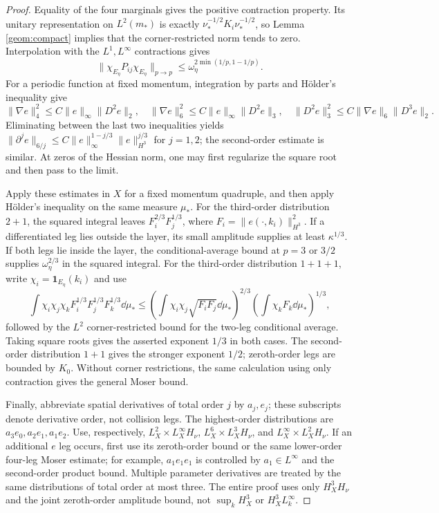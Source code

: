 \begin{proof}
Equality of the four marginals gives the positive contraction property.
Its unitary representation on $L^2(m_*)$ is exactly
$\nu_*^{-1/2}K_i\nu_*^{-1/2}$, so Lemma \ref{geom:compact}
implies that the corner-restricted norm tends to zero.
Interpolation with the $L^1,L^\infty$ contractions gives
\[
 \|\chi_{E_\eta} P_{ij}\chi_{E_\eta}\|_{p\to p}
       \le\omega_\eta^{2\min(1/p,1-1/p)}.
\]
For a periodic function at fixed momentum, integration by parts and
Hölder's inequality give
\[
 \|\nabla e\|_4^2\le C\|e\|_\infty\|D^2e\|_2,
 \quad \|\nabla e\|_6^2\le C\|e\|_\infty\|D^2e\|_3,
 \quad \|D^2e\|_3^2\le C\|\nabla e\|_6\|D^3e\|_2.
\]
Eliminating between the last two inequalities yields
$\|\partial^je\|_{6/j}\le C\|e\|_\infty^{1-j/3}
\|e\|_{H^3}^{j/3}$ for $j=1,2$; the second-order estimate is similar.
At zeros of the Hessian norm, one may first regularize the square root
and then pass to the limit.

Apply these estimates in $X$ for a fixed momentum quadruple, and then
apply Hölder's inequality on the same measure $\mu_*$.
For the third-order distribution $2+1$, the squared integral leaves
$F_i^{2/3}F_j^{1/3}$, where $F_i=\|e(\cdot,k_i)\|_{H^3}^2$.
If a differentiated leg lies outside the layer, its small amplitude
supplies at least $\kappa^{1/3}$.
If both legs lie inside the layer, the conditional-average bound at
$p=3$ or $3/2$ supplies $\omega_\eta^{2/3}$ in the squared integral.
For the third-order distribution $1+1+1$, write
$\chi_i=\mathbf1_{E_\eta}(k_i)$ and use
\[
 \int\chi_i\chi_j\chi_k F_i^{1/3}F_j^{1/3}F_k^{1/3}\dd\mu_*
 \le\left(\int\chi_i\chi_j\sqrt{F_iF_j}\dd\mu_*\right)^{2/3}
     \left(\int\chi_kF_k\dd\mu_*\right)^{1/3},
\]
followed by the $L^2$ corner-restricted bound for the two-leg conditional
average. Taking square roots gives the asserted exponent $1/3$ in
both cases. The second-order distribution $1+1$ gives the stronger
exponent $1/2$; zeroth-order legs are bounded by $K_0$.
Without corner restrictions, the same calculation using only contraction
gives the general Moser bound.

Finally, abbreviate spatial derivatives of total order $j$ by $a_j,e_j$;
these subscripts denote derivative order, not collision legs.
The highest-order distributions are $a_3e_0,a_2e_1,a_1e_2$.
Use, respectively,
$L^2_X\times L^\infty_XH_\nu$,
$L^6_X\times L^3_XH_\nu$, and
$L^\infty_X\times L^2_XH_\nu$.
If an additional $e$ leg occurs, first use its zeroth-order bound or the
same lower-order four-leg Moser estimate; for example, $a_1e_1e_1$
is controlled by $a_1\in L^\infty$ and the second-order product bound.
Multiple parameter derivatives are treated by the same distributions
of total order at most three.
The entire proof uses only $H^3_XH_\nu$ and the joint zeroth-order
amplitude bound, not $\sup_kH^3_X$ or $H^3_XL^\infty_k$.
\end{proof}
